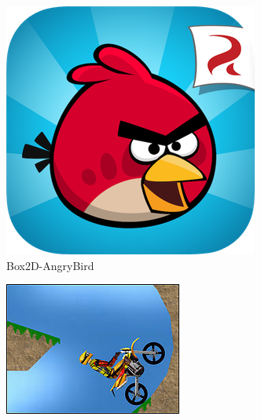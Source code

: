 \begin{figure}[h]
    \begin{subfigure}[b]{0.24\linewidth}
    \includegraphics[width=\linewidth]{./resources/physics/angryBird.png}
    \caption{Box2D-AngryBird}
    \end{subfigure}
    \begin{subfigure}[b]{0.24\linewidth}
    \includegraphics[width=\linewidth]{./resources/physics/ODE(3).png}

\end{subfigure}
\end{figure}
